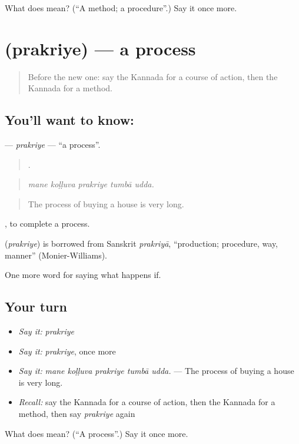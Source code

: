 \begin{tcolorbox}[breakable,colback=teal!4,colframe=teal!35!black,title={Before you move on}]
What does  mean? (\textquotedblleft{}A method; a procedure\textquotedblright{}.) Say it once more.
\end{tcolorbox}
\section[\texorpdfstring{\kn{ಪ್ರಕ್ರಿಯೆ} (prakriye)}{ಪ್ರಕ್ರಿಯೆ (prakriye)}]{ (prakriye) — a process}

\label{lesson:KA-C422-prakriye}



\begin{quote}
Before the new one: say the Kannada for a course of action, then the Kannada for a method.
\end{quote}

\subsection*{You'll want to know: }
\textbf{} — \emph{prakriye} — \textquotedblleft{}a process\textquotedblright{}.

\begin{quote}
    .
\end{quote}

\begin{quote}
\emph{mane koḷḷuva prakriye tumbā udda.}
\end{quote}

\begin{quote}
The process of buying a house is very long.
\end{quote}

 , to complete a process.

\begin{cousinweb}
\textbf{} (\emph{prakriye}) is borrowed from Sanskrit \emph{prakriyā}, \textquotedblleft{}production; procedure, way, manner\textquotedblright{} (Monier-Williams).
\end{cousinweb}

\begin{grammarlens}[title={What you've built}]
One more word for saying what happens if.
\end{grammarlens}

\subsection*{Your turn}
\begin{itemize}
\raggedright
  \item \emph{Say it:} \emph{prakriye}
  \item \emph{Say it:} \emph{prakriye}, once more
  \item \emph{Say it:} \emph{mane koḷḷuva prakriye tumbā udda.} — The process of buying a house is very long.
  \item \emph{Recall:} say the Kannada for a course of action, then the Kannada for a method, then say \emph{prakriye} again
\end{itemize}

\begin{tcolorbox}[breakable,colback=teal!4,colframe=teal!35!black,title={Before you move on}]
What does  mean? (\textquotedblleft{}A process\textquotedblright{}.) Say it once more.
\end{tcolorbox}
